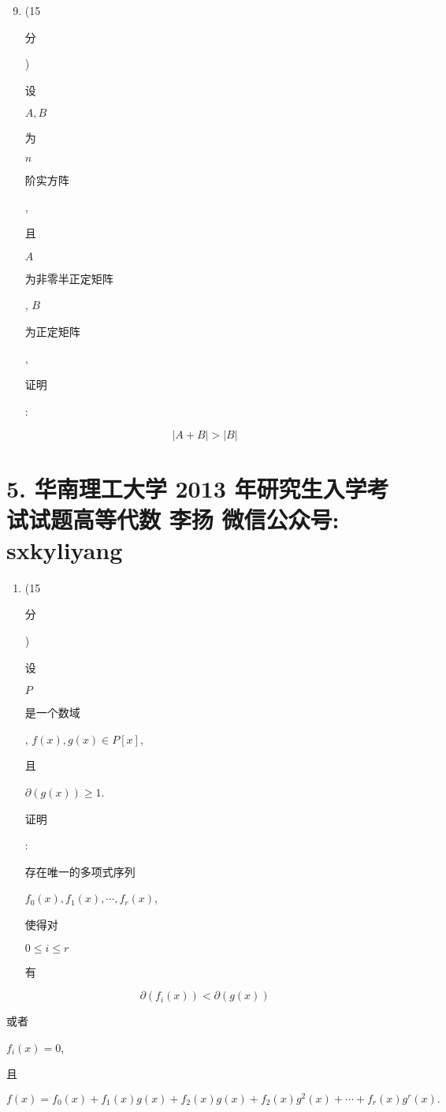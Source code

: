 \documentclass[10pt]{article}
\begin{document}
\begin{enumerate}
  \setcounter{enumi}{8}
  \item (15 \begin{CJK}{UTF8}{mj}分\end{CJK}) \begin{CJK}{UTF8}{mj}设\end{CJK} $A, B$ \begin{CJK}{UTF8}{mj}为\end{CJK} $n$ \begin{CJK}{UTF8}{mj}阶实方阵\end{CJK}, \begin{CJK}{UTF8}{mj}且\end{CJK} $A$ \begin{CJK}{UTF8}{mj}为非零半正定矩阵\end{CJK}, $B$ \begin{CJK}{UTF8}{mj}为正定矩阵\end{CJK}, \begin{CJK}{UTF8}{mj}证明\end{CJK}:
\end{enumerate}
$$
|A+B|>|B|
$$

\section{5. 华南理工大学 2013 年研究生入学考试试题高等代数 
 李扬 
 微信公众号: sxkyliyang}
\begin{enumerate}
  \item (15 \begin{CJK}{UTF8}{mj}分\end{CJK}) \begin{CJK}{UTF8}{mj}设\end{CJK} $P$ \begin{CJK}{UTF8}{mj}是一个数域\end{CJK}, $f(x), g(x) \in P[x]$, \begin{CJK}{UTF8}{mj}且\end{CJK} $\partial(g(x)) \geq 1$. \begin{CJK}{UTF8}{mj}证明\end{CJK}: \begin{CJK}{UTF8}{mj}存在唯一的多项式序列\end{CJK} $f_{0}(x), f_{1}(x), \cdots, f_{r}(x)$, \begin{CJK}{UTF8}{mj}使得对\end{CJK} $0 \leq i \leq r$ \begin{CJK}{UTF8}{mj}有\end{CJK}
\end{enumerate}
$$
\partial\left(f_{i}(x)\right)<\partial(g(x))
$$
\begin{CJK}{UTF8}{mj}或者\end{CJK} $f_{i}(x)=0$, \begin{CJK}{UTF8}{mj}且\end{CJK}
$$
f(x)=f_{0}(x)+f_{1}(x) g(x)+f_{2}(x) g(x)+f_{2}(x) g^{2}(x)+\cdots+f_{r}(x) g^{r}(x) .
$$
\end{document}
